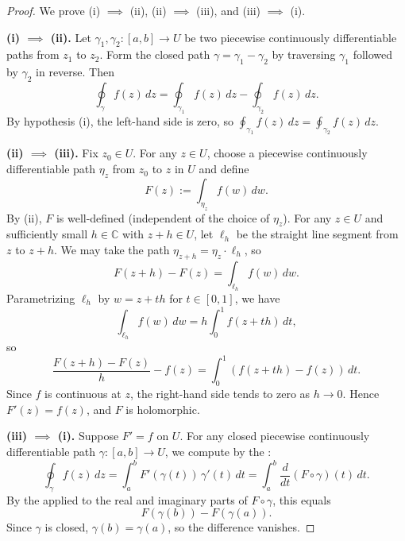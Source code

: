 \begin{proof}
    We prove (i) $\implies$ (ii), (ii) $\implies$ (iii), and (iii) $\implies$ (i).

    \textbf{(i) $\implies$ (ii).} Let $\gamma_1, \gamma_2 : [a,b] \to U$ be two piecewise continuously differentiable paths from $z_1$ to $z_2$. Form the closed path $\gamma = \gamma_1 - \gamma_2$ by traversing $\gamma_1$ followed by $\gamma_2$ in reverse. Then
    $$\oint_{\gamma} f(z)\,dz = \oint_{\gamma_1} f(z)\,dz - \oint_{\gamma_2} f(z)\,dz.$$
    By hypothesis (i), the left-hand side is zero, so $\displaystyle\oint_{\gamma_1} f(z)\,dz = \oint_{\gamma_2} f(z)\,dz$.

    \textbf{(ii) $\implies$ (iii).} Fix $z_0 \in U$. For any $z \in U$, choose a piecewise continuously differentiable path $\eta_z$ from $z_0$ to $z$ in $U$ and define
    $$F(z) := \int_{\eta_z} f(w)\,dw.$$
    By (ii), $F$ is well-defined (independent of the choice of $\eta_z$). For any $z \in U$ and sufficiently small $h \in \mathbb{C}$ with $z + h \in U$, let $\ell_h$ be the straight line segment from $z$ to $z+h$. We may take the path $\eta_{z+h} = \eta_z \cdot \ell_h$, so
    $$F(z+h) - F(z) = \int_{\ell_h} f(w)\,dw.$$
    Parametrizing $\ell_h$ by $w = z + th$ for $t \in [0,1]$, we have
    $$\int_{\ell_h} f(w)\,dw = h \int_0^1 f(z+th)\,dt,$$
    so
    $$\frac{F(z+h) - F(z)}{h} - f(z) = \int_0^1 (f(z+th) - f(z))\,dt.$$
    Since $f$ is continuous at $z$, the right-hand side tends to zero as $h \to 0$. Hence $F'(z) = f(z)$, and $F$ is holomorphic.

    \textbf{(iii) $\implies$ (i).} Suppose $F' = f$ on $U$. For any closed piecewise continuously differentiable path $\gamma : [a,b] \to U$, we compute by the :
    $$\oint_{\gamma} f(z)\,dz = \int_a^b F'(\gamma(t))\,\gamma'(t)\,dt = \int_a^b \frac{d}{dt}(F \circ \gamma)(t)\,dt.$$
    By the  applied to the real and imaginary parts of $F \circ \gamma$, this equals
    $$F(\gamma(b)) - F(\gamma(a)).$$
    Since $\gamma$ is closed, $\gamma(b) = \gamma(a)$, so the difference vanishes.
\end{proof}
